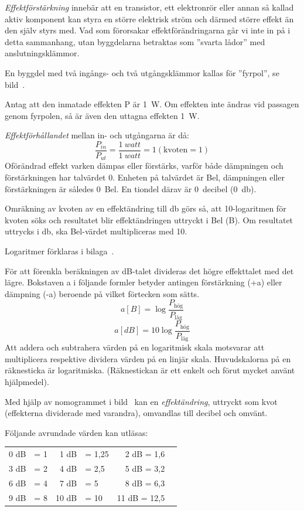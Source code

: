 \emph{Effektförstärkning} innebär att en transistor, ett elektronrör eller
annan så kallad aktiv komponent kan styra en större elektrisk ström och därmed
större effekt än den själv styrs med.
Vad som förorsakar effektförändringarna går vi inte in på i detta sammanhang,
utan byggdelarna betraktas som ''svarta lådor'' med anslutningsklämmor.

En byggdel med två ingångs- och två utgångsklämmor kallas för ''fyrpol'', se
bild~.


Antag att den inmatade effekten P är \qty{1}{\watt}.
Om effekten inte ändras vid passagen genom fyrpolen, så är även den uttagna
effekten \qty{1}{\watt}.

\emph{Effektförhållandet} mellan in- och utgångarna är då:
\[\dfrac{P_{in}}{P_{ut}} = \dfrac{1\ \textit{watt}}{1\ \textit{watt}} = 1 (\text{kvoten} = 1)\]
Oförändrad effekt varken dämpas eller förstärks, varför både dämpningen och
förstärkningen har talvärdet 0.
Enheten på talvärdet är Bel, dämpningen eller förstärkningen är således 0~Bel.
En tiondel därav är 0~decibel (\qty{0}{\decibel}).

Omräkning av kvoten av en effektändring till \unit{\decibel} görs så, att
10-logaritmen för kvoten söks och resultatet blir effektändringen uttryckt i Bel
(B).
Om resultatet uttrycks i \unit{\decibel}, ska Bel-värdet multipliceras med 10.

Logaritmer förklaras i bilaga~.

För att förenkla beräkningen av dB-talet divideras det högre effekttalet med det
lägre.
Bokstaven a i följande formler betyder antingen förstärkning (+a) eller
dämpning (-a) beroende på vilket förtecken som sätts.
\[a[B] = \log \dfrac{P_{\text{hög}}}{P_{\text{låg}}}\]
\[a[dB] = 10\log \dfrac{P_{\text{hög}}}{P_{\text{låg}}}\]
Att addera och subtrahera värden på en logaritmisk skala motsvarar att
multiplicera respektive dividera värden på en linjär skala.
Huvudskalorna på en räknesticka är logaritmiska.
(Räknestickan är ett enkelt och förut mycket använt hjälpmedel).

Med hjälp av nomogrammet i bild~ kan en
\emph{effektändring}, uttryckt som kvot (effekterna dividerade med varandra),
omvandlas till decibel och omvänt.


Följande avrundade värden kan utläsas:

\begin{center}
\begin{tabular}{rlrlrl}
0 dB & = 1 &  1 dB & =  1,25 & 2 dB = 1,6 \\
3 dB & = 2 &  4 dB & =  2,5  & 5 dB = 3,2 \\
6 dB & = 4 &  7 dB & =  5    & 8 dB = 6,3 \\
9 dB & = 8 & 10 dB & = 10    & 11 dB = 12,5
\end{tabular}
\end{center}

